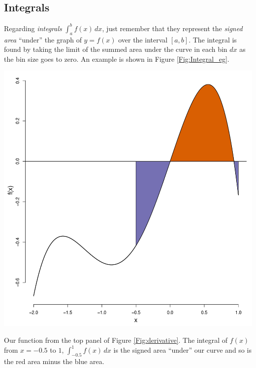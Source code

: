 \subsection{Integrals} Regarding  \emph{integrals} $\int_a^b f(x)\,dx$, just remember that
they represent the \emph{signed area} ``under'' the graph of $y=f(x)$
over the interval $[a,b]$. %
The integral is found by taking the limit of the summed area under the curve in each bin $dx$ as the
bin size goes to zero. An example is shown in Figure
\ref{Fig:Integral_eg}. 
 \begin{marginfigure}
 \begin{center}
   \includegraphics[width=\textwidth]{math_background/calc_pics/Integral_eg.pdf}\end{center}
 \caption{Our function from the top panel of Figure
   \ref{Fig:derivative}. The integral of $f(x)$ from $x=-0.5$ to $1$,
   $\int_{-0.5}^1 f(x)\,dx$  is the signed area ``under'' our curve
   and so is the red area minus the blue area. }\label{Fig:Integral_eg}
\end{marginfigure}

